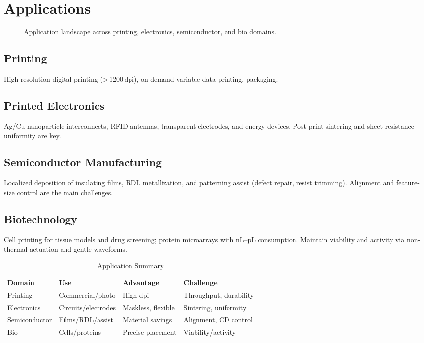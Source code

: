 \documentclass[conference]{IEEEtran}
\begin{document}
\section{Applications}

\begin{figure*}[!t]
  \centering
  
  \caption{Application landscape across printing, electronics, semiconductor, and bio domains.}
  \label{fig:application_matrix}
\end{figure*}

\subsection{Printing}
High-resolution digital printing (>\,1200\,dpi), on-demand variable data printing, packaging.

\subsection{Printed Electronics}
Ag/Cu nanoparticle interconnects, RFID antennas, transparent electrodes, and energy devices. Post-print sintering and sheet resistance uniformity are key.

\subsection{Semiconductor Manufacturing}
Localized deposition of insulating films, RDL metallization, and patterning assist (defect repair, resist trimming). Alignment and feature-size control are the main challenges.

\subsection{Biotechnology}
Cell printing for tissue models and drug screening; protein microarrays with nL--pL consumption. Maintain viability and activity via non-thermal actuation and gentle waveforms.

\begin{table}[!t]
\caption{Application Summary}
\label{tab:apps}
\centering
\begin{tabular}{@{}llll@{}}
\toprule
Domain & Use & Advantage & Challenge \\
\midrule
Printing & Commercial/photo & High dpi & Throughput, durability \\
Electronics & Circuits/electrodes & Maskless, flexible & Sintering, uniformity \\
Semiconductor & Films/RDL/assist & Material savings & Alignment, CD control \\
Bio & Cells/proteins & Precise placement & Viability/activity \\
\bottomrule
\end{tabular}
\end{table}
\end{document}
